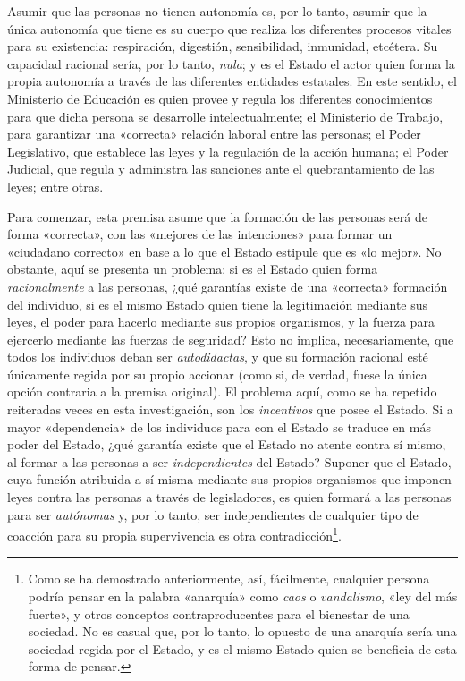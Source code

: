 \documentclass[12pt,a4paper,twoside]{book}
\begin{document}
Asumir que las personas no tienen autonomía es, por lo tanto, asumir que la única autonomía que tiene es su cuerpo que realiza los diferentes procesos vitales para su existencia: respiración, digestión, sensibilidad, inmunidad, etcétera. Su capacidad racional sería, por lo tanto, \textit{nula}; y es el Estado el actor quien forma la propia autonomía a través de las diferentes entidades estatales. En este sentido, el Ministerio de Educación es quien provee y regula los diferentes conocimientos para que dicha persona se desarrolle intelectualmente; el Ministerio de Trabajo, para garantizar una «correcta» relación laboral entre las personas; el Poder Legislativo, que establece las leyes y la regulación de la acción humana; el Poder Judicial, que regula y administra las sanciones ante el quebrantamiento de las leyes; entre otras.

Para comenzar, esta premisa asume que la formación de las personas será de forma «correcta», con las «mejores de las intenciones» para formar un «ciudadano correcto» en base a lo que el Estado estipule que es «lo mejor». No obstante, aquí se presenta un problema: si es el Estado quien forma \textit{racionalmente} a las personas, ¿qué garantías existe de una «correcta» formación del individuo, si es el mismo Estado quien tiene la legitimación mediante sus leyes, el poder para hacerlo mediante sus propios organismos, y la fuerza para ejercerlo mediante las fuerzas de seguridad? Esto no implica, necesariamente, que todos los individuos deban ser \textit{autodidactas}, y que su formación racional esté únicamente regida por su propio accionar (como si, de verdad, fuese la única opción contraria a la premisa original). El problema aquí, como se ha repetido reiteradas veces en esta investigación, son los \textit{incentivos} que posee el Estado. Si a mayor «dependencia» de los individuos para con el Estado se traduce en más poder del Estado, ¿qué garantía existe que el Estado no atente contra sí mismo, al formar a las personas a ser \textit{independientes} del Estado? Suponer que el Estado, cuya función atribuida a sí misma mediante sus propios organismos que imponen leyes contra las personas a través de legisladores, es quien formará a las personas para ser \textit{autónomas} y, por lo tanto, ser independientes de cualquier tipo de coacción para su propia supervivencia es otra contradicción\footnote{Como se ha demostrado anteriormente, así, fácilmente, cualquier persona podría pensar en la palabra «anarquía» como \textit{caos} o \textit{vandalismo}, «ley del más fuerte», y otros conceptos contraproducentes para el bienestar de una sociedad. No es casual que, por lo tanto, lo opuesto de una anarquía sería una sociedad regida por el Estado, y es el mismo Estado quien se beneficia de esta forma de pensar.}.
\end{document}
